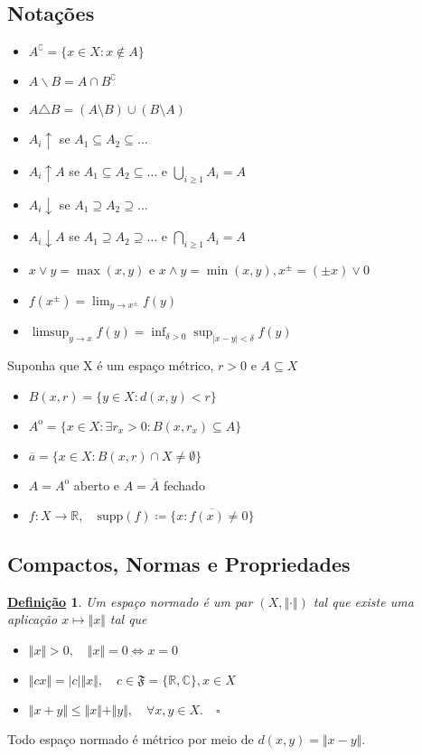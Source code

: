 \documentclass{article}
\newtheorem*{def*}{\underline{Defini\c c\~ao}}
\begin{document}
\subsection{Notações}
\begin{itemize}
	\item \(A ^{\complement} = \{x\in X: x\not\in A\}\)
	\item \(A\backslash B = A\cap B ^{\complement}\)
	\item \(A\triangle B = (A\setminus{B})\cup (B\setminus{A})\)
	\item \(A_{i}\uparrow \) se \(A_{1}\subseteq A_{2}\subseteq \dotsc \)
	\item \(A_{i}\uparrow A\) se \(A_{1}\subseteq A_{2}\subseteq \dotsc \) e \(\bigcup_{i\geq 1}^{}A_{i} = A\)
	\item \(A_{i} \downarrow \) se \(A_{1}\supseteq A_{2}\supseteq \dotsc \)
	\item \(A_{i} \downarrow A\) se \(A_{1}\supseteq A_{2}\supseteq \dotsc \) e \(\bigcap_{i\geq 1}^{}A_{i} = A\)
	\item \(x\vee y = \max(x, y)\) e \(x\wedge y = \min(x, y), x^{\pm} = (\pm x)\vee 0\)
	\item \(f(x^{\pm}) = \lim_{y\to x^{\pm}}f(y)\)
	\item \(\limsup_{y\to x}f(y) = \inf_{\delta > 0}\sup_{|x-y|<\delta }f(y)\)
\end{itemize}

Suponha que X é um espaço métrico, \(r > 0\) e \(A\subseteq X\)
\begin{itemize}
	\item \(B(x, r) = \{y\in X: d(x, y) < r\}\)
	\item \(A^{\mathrm{o}} = \{x\in X: \exists r_{x} > 0: B(x, r_{x})\subseteq A\}\)
	\item \(\overline{a} = \{x\in X: B(x, r)\cap X \neq\emptyset\}\)
	\item  \(A = A ^{\mathrm{o}}\) aberto e \(A = \overline{A} \) fechado
	\item \(f:X\rightarrow \mathbb{R},\quad \mathrm{supp}(f)\coloneqq \overline{\{x: f(x)\neq 0\}}\)
\end{itemize}
\subsection{Compactos, Normas e Propriedades}
\begin{def*}
	Um espaço normado é um par \((X, \Vert \cdot  \Vert)\) tal que existe uma aplicação \(x \mapsto \Vert x \Vert\) tal que
	\begin{itemize}
		\item[i)] \(\Vert x \Vert > 0,\quad \Vert x \Vert = 0 \Longleftrightarrow x = 0\)
		\item[ii)] \(\Vert cx \Vert = |c|\Vert x \Vert, \quad c\in \mathfrak{F} = \{\mathbb{R}, \mathbb{C}\}, x\in X\)
		\item[iii)] \(\Vert x + y \Vert \leq \Vert x \Vert + \Vert y \Vert,\quad \forall x, y\in X.\quad \square\)
	\end{itemize}
\end{def*}
Todo espaço normado é métrico por meio de \(d(x, y) = \Vert x - y \Vert\).
\end{document}
